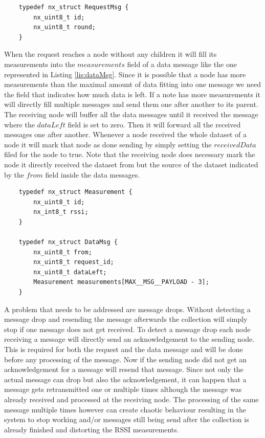 \begin{lstlisting}
	typedef nx_struct RequestMsg {
		nx_uint8_t id;
		nx_uint8_t round;
	}
\end{lstlisting}

When the request reaches a node without any children it will fill its measurements into the $measurements$ field of a data message like the one represented in Listing \ref{lis:dataMsg}.
Since it is possible that a node has more measurements than the maximal amount of data fitting into one message we need the field that indicates how much data is left. If a note has more measurements it will directly fill multiple messages and send them one after another to its parent. The receiving node will buffer all the data messages until it received the message where the $dataLeft$ field is set to zero. Then it will forward all the received messages one after another. Whenever a node received the whole dataset of a node it will mark that node as done sending by simply setting the $receivedData$ filed for the node to true. Note that the receiving node does necessary mark the node it directly received the dataset from but the source of the dataset indicated by the $from$ field inside the data messages.

\begin{lstlisting}
	typedef nx_struct Measurement {
		nx_uint8_t id;
		nx_int8_t rssi;
	}

	typedef nx_struct DataMsg {
		nx_uint8_t from;
		nx_uint8_t request_id;
		nx_uint8_t dataLeft;
		Measurement measurements[MAX__MSG__PAYLOAD - 3];
	}
\end{lstlisting}

A problem that needs to be addressed are message drops. Without detecting a message drop and resending the message afterwards the collection will simply stop if one message does not get received. To detect a message drop each node receiving a message will directly send an acknowledgement to the sending node. This is required for both the request and the data message and will be done before any processing of the message. Now if the sending node did not get an acknowledgement for a message will resend that message. Since not only the actual message can drop but also the acknowledgement, it can happen that a message gets retransmitted one or multiple times although the message was already received and processed at the receiving node. The processing of the same message multiple times however can create chaotic behaviour resulting in the system to stop working and/or messages still being send after the collection is already finished and distorting the RSSI measurements. 

